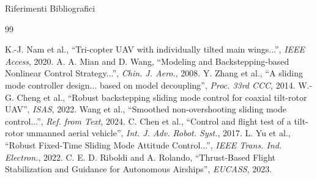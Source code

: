 \documentclass[aspectratio=169]{beamer}
\begin{document}
\begin{frame}[allowframebreaks]{Riferimenti Bibliografici}
    \tiny 
    \begin{thebibliography}{99}
        
         K.-J. Nam et al., ``Tri-copter UAV with individually tilted main wings...'', \textit{IEEE Access}, 2020.
         A. A. Mian and D. Wang, ``Modeling and Backstepping-based Nonlinear Control Strategy...'', \textit{Chin. J. Aero.}, 2008.
         Y. Zhang et al., ``A sliding mode controller design... based on model decoupling'', \textit{Proc. 33rd CCC}, 2014.
         W.-G. Cheng et al., ``Robust backstepping sliding mode control for coaxial tilt-rotor UAV'', \textit{ISAS}, 2022.
         Wang et al., ``Smoothed non-overshooting sliding mode control...'', \textit{Ref. from Text}, 2024.
         C. Chen et al., ``Control and flight test of a tilt-rotor unmanned aerial vehicle'', \textit{Int. J. Adv. Robot. Syst.}, 2017.
         L. Yu et al., ``Robust Fixed-Time Sliding Mode Attitude Control...'', \textit{IEEE Trans. Ind. Electron.}, 2022.
         C. E. D. Riboldi and A. Rolando, ``Thrust-Based Flight Stabilization and Guidance for Autonomous Airships'', \textit{EUCASS}, 2023.

    \end{thebibliography}
\end{frame}
\end{document}
